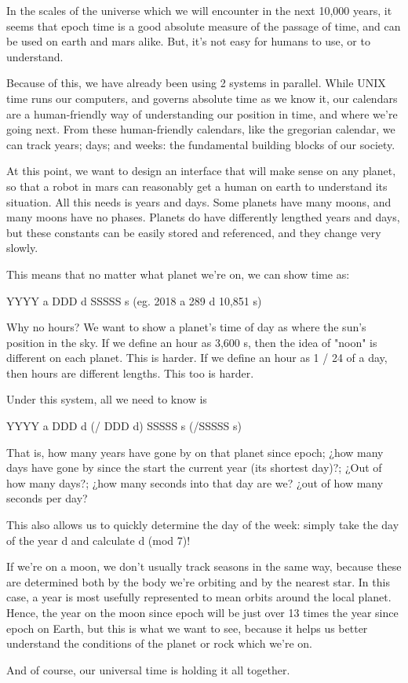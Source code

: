 \documentclass{article}
\begin{document}
In the scales of the universe which we will encounter in the next 10,000 years,
it seems that epoch time is a good absolute measure of the passage of time, and
can be used on earth and mars alike. But, it's not easy for humans to use, or to
understand.

Because of this, we have already been using 2 systems in parallel. While UNIX
time runs our computers, and governs absolute time as we know it, our calendars
are a human-friendly way of understanding our position in time, and where we're
going next. From these human-friendly calendars, like the gregorian calendar, we
can track years; days; and weeks: the fundamental building blocks of our
society.

At this point, we want to design an interface that will make sense on any
planet, so that a robot in mars can reasonably get a human on earth to
understand its situation. All this needs is years and days. Some planets have
many moons, and many moons have no phases. Planets do have differently lengthed
years and days, but these constants can be easily stored and referenced, and
they change very slowly.

This means that no matter what planet we're on, we can show time as:

YYYY a DDD d SSSSS s (eg. 2018 a 289 d 10,851 s)

Why no hours? We want to show a planet's time of day as where the sun's position
in the sky. If we define an hour as 3,600 s, then the idea of "noon" is
different on each planet. This is harder. If we define an hour as 1 / 24 of a
day, then hours are different lengths. This too is harder.

Under this system, all we need to know is

YYYY a DDD d (/ DDD d) SSSSS s (/SSSSS s)

That is, how many years have gone by on that planet since epoch; ¿how many days
have gone by since the start the current year (its shortest day)?; ¿Out of how
many days?; ¿how many seconds into that day are we? ¿out of how many seconds per
day?

This also allows us to quickly determine the day of the week: simply take the
day of the year d and calculate d (mod 7)!

If we're on a moon, we don't usually track seasons in the same way, because
these are determined both by the body we're orbiting and by the nearest star. In
this case, a year is most usefully represented to mean orbits around the local
planet. Hence, the year on the moon since epoch will be just over 13 times the
year since epoch on Earth, but this is what we want to see, because it helps us
better understand the conditions of the planet or rock which we're on.

And of course, our universal time is holding it all together.
\end{document}
